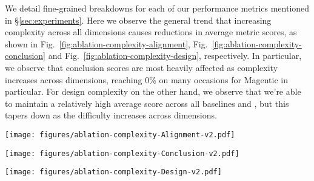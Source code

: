 We detail fine-grained breakdowns for each of our performance metrics mentioned in \S\ref{sec:experiments}. Here we observe the general trend that increasing complexity across all dimensions causes reductions in average metric scores, as shown in Fig.~\ref{fig:ablation-complexity-alignment}, Fig.~\ref{fig:ablation-complexity-conclusion} and Fig.~\ref{fig:ablation-complexity-design}, respectively. In particular, we observe that conclusion scores are most heavily affected as complexity increases across dimensions, reaching 0\% on many occasions for Magentic in particular. For design complexity on the other hand, we observe that we're able to maintain a relatively high average score across all baselines and \sys, but this tapers down as the difficulty increases across dimensions. 

\begin{figure*}
    \centering
    \texttt{[image: figures/ablation-complexity-Alignment-v2.pdf]}
    \caption{Average alignment scores across different complexity dimensions at varying difficulty levels for \sys, OpenHands, and Magentic. \sys outperforms the others consistently, with performance generally dropping as complexity increases.}
    \label{fig:ablation-complexity-alignment}
\end{figure*}

\begin{figure*}
    \centering
    \texttt{[image: figures/ablation-complexity-Conclusion-v2.pdf]}
    \caption{Average conclusion scores across different complexity dimensions at varying difficulty levels for \sys, OpenHands, and Magentic. \sys outperforms the others consistently, with performance generally dropping as complexity increases.}
    \label{fig:ablation-complexity-conclusion}
\end{figure*}

\begin{figure*}
    \centering
    \texttt{[image: figures/ablation-complexity-Design-v2.pdf]}
    \caption{Average design scores across different complexity dimensions at varying difficulty levels for \sys, OpenHands, and Magentic. \sys outperforms the others consistently, with performance generally dropping as complexity increases.}
    \label{fig:ablation-complexity-design}
\end{figure*}



